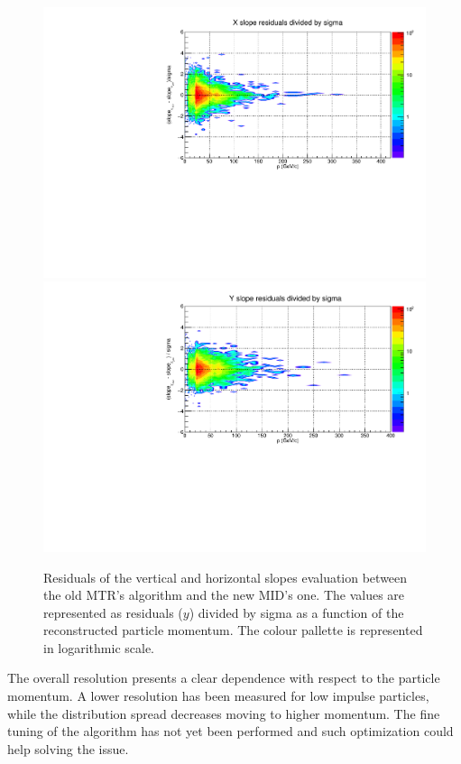 \begin{figure}[!]
\begin{center}
\includegraphics[width=0.9\linewidth]{Chapters/O2/Figs/TRmx_sigma.pdf}
\includegraphics[width=0.9\linewidth]{Chapters/O2/Figs/TRmy_sigma.pdf}
\caption{Residuals of the vertical and horizontal slopes evaluation between the old MTR's algorithm and the new MID's one. The values are represented as residuals ($y$) divided by sigma as a function of the reconstructed particle momentum. The colour pallette is represented in logarithmic scale.}
\label{fig:MID_TRm}
\end{center}
\end{figure}

The overall resolution presents a clear dependence with respect to the particle momentum.
A lower resolution has been measured for low impulse particles, while the distribution spread decreases moving to higher momentum.
The fine tuning of the algorithm has not yet been performed and such optimization could help solving the issue.

